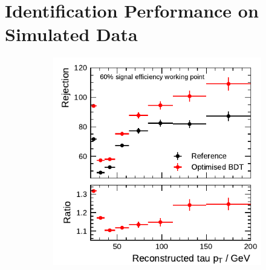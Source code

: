 

\section{Identification Performance on Simulated Data}
\label{sec:bdt_perf}

\begin{figure}[ht]
  \centering
  \begin{subfigure}[t]{0.48\textwidth}
    \centering
    \includegraphics{./figures/bdt_perf/post_optimisation/rejection_tight_1p.pdf}
  \end{subfigure}\hfill
  \begin{subfigure}[t]{0.48\textwidth}
    \centering

\end{subfigure}
\end{figure}

